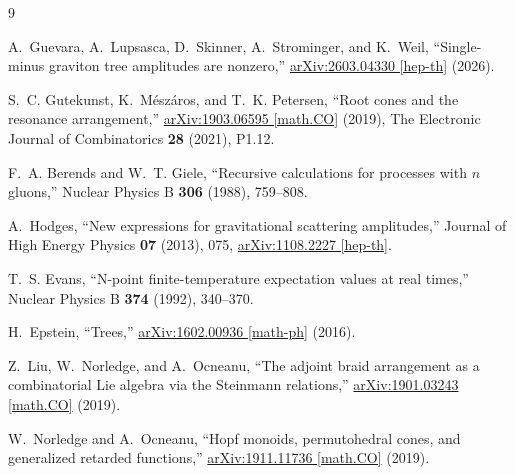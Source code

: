 \documentclass[11pt]{article}
\theoremstyle{definition}
\theoremstyle{remark}
\begin{document}
\begin{thebibliography}{9}

A.~Guevara, A.~Lupsasca, D.~Skinner, A.~Strominger, and K.~Weil,
``Single-minus graviton tree amplitudes are nonzero,''
\href{https://arxiv.org/abs/2603.04330}{arXiv:2603.04330 [hep-th]} (2026).

S.~C. Gutekunst, K.~M\'esz\'aros, and T.~K. Petersen,
``Root cones and the resonance arrangement,''
\href{https://arxiv.org/abs/1903.06595}{arXiv:1903.06595 [math.CO]} (2019),
The Electronic Journal of Combinatorics \textbf{28} (2021), P1.12.

F.~A. Berends and W.~T. Giele,
``Recursive calculations for processes with $n$ gluons,''
Nuclear Physics B \textbf{306} (1988), 759--808.

A.~Hodges,
``New expressions for gravitational scattering amplitudes,''
Journal of High Energy Physics \textbf{07} (2013), 075,
\href{https://arxiv.org/abs/1108.2227}{arXiv:1108.2227 [hep-th]}.

T.~S. Evans,
``N-point finite-temperature expectation values at real times,''
Nuclear Physics B \textbf{374} (1992), 340--370.

H.~Epstein,
``Trees,''
\href{https://arxiv.org/abs/1602.00936}{arXiv:1602.00936 [math-ph]} (2016).

Z.~Liu, W.~Norledge, and A.~Ocneanu,
``The adjoint braid arrangement as a combinatorial Lie algebra via the
Steinmann relations,''
\href{https://arxiv.org/abs/1901.03243}{arXiv:1901.03243 [math.CO]} (2019).

W.~Norledge and A.~Ocneanu,
``Hopf monoids, permutohedral cones, and generalized retarded functions,''
\href{https://arxiv.org/abs/1911.11736}{arXiv:1911.11736 [math.CO]} (2019).

\end{thebibliography}
\end{document}
